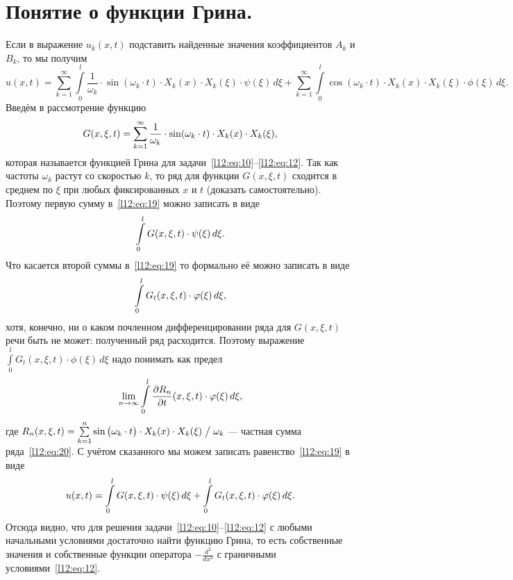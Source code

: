 \documentclass[12pt,a4paper,openany,fleqn]{book}
\newcommand{\dder}[2]{\ensuremath{\frac{d^2#1}{d#2^2}}}
\newcommand{\pder}[2]{\ensuremath{\frac{\partial#1}{\partial#2}}}
\theoremstyle{definition}
\begin{document}
\section{Понятие о функции Грина.}
\label{lecture11section3}
Если в выражение $u_k(x,t)$ подставить найденные значения коэффициентов $A_k$ и  $B_k$, то мы получим
\begin{equation}
	\label{l12:eq:19}
	u(x,t)=\sum\limits_{k=1}^{\infty}\int\limits_0^l\frac{1}{\omega_k}\cdot\sin(\omega_k\cdot t)\cdot X_k(x)\cdot X_k(\xi)\cdot\psi(\xi)\,d\xi+ \sum\limits_{k=1}^{\infty}\int\limits_0^l\cos(\omega_k\cdot t)\cdot X_k(x)\cdot X_k(\xi)\cdot\phi(\xi)\,d\xi.
\end{equation}
Введём в рассмотрение функцию
\begin{equation}
	\label{l12:eq:20}
	\hfill G(x,\xi,t)=\sum\limits_{k=1}^{\infty}\frac{1}{\omega_k}\cdot\sin(\omega_k\cdot t)\cdot X_k(x)\cdot X_k(\xi),\hfill
\end{equation}
которая называется функцией Грина для задачи~\eqref{l12:eq:10}--\eqref{l12:eq:12}. Так как частоты $\omega_k$ растут со скоростью $k$, то ряд для функции $G(x,\xi,t)$ сходится в среднем по $\xi$ при любых фиксированных $x$ и $t$ (доказать самостоятельно). Поэтому первую сумму в~\eqref{l12:eq:19} можно записать в виде 
\begin{equation*}
	\hfill\int\limits_0^l G(x,\xi,t)\cdot\psi(\xi)\,d\xi.\hfill
\end{equation*}
Что касается второй суммы в~\eqref{l12:eq:19} то формально её можно записать в виде 
\begin{equation*}
	\hfill\int\limits_0^l G_t(x,\xi,t)\cdot\phi(\xi)\,d\xi,\hfill
\end{equation*}
хотя, конечно, ни о каком почленном дифференцировании ряда для $G(x,\xi,t)$ речи быть не может: полученный ряд расходится. Поэтому выражение $\int\limits_0^l G_t(x,\xi,t)\cdot\phi(\xi)\,d\xi$ надо понимать как предел 
\begin{equation*}
	\hfill\lim\limits_{n\to\infty}\int\limits_0^l\pder{R_n}{t}(x,\xi,t)\cdot\phi(\xi)\,d\xi,\hfill
\end{equation*}
где $R_n(x,\xi,t)=\sum\limits_{k=1}^n\sin\big(\omega_k\cdot t\big)\cdot X_k(x)\cdot X_k(\xi)\bigm/\omega_k$ --- частная сумма ряда~\eqref{l12:eq:20}. С учётом сказанного мы можем записать равенство~\eqref{l12:eq:19} в виде
\begin{equation}
	\label{l12:eq:21}
	\hfill u(x,t)=\int\limits_0^l G(x,\xi,t)\cdot\psi(\xi)\,d\xi+\int\limits_0^l G_t(x,\xi,t)\cdot\phi(\xi)\,d\xi.\hfill
\end{equation}
Отсюда видно, что для решения задачи~\eqref{l12:eq:10}--\eqref{l12:eq:12} с любыми начальными условиями достаточно найти функцию Грина, то есть собственные значения и собственные функции оператора $-\dder{}{x}$ с граничными условиями~\eqref{l12:eq:12}.
\end{document}
